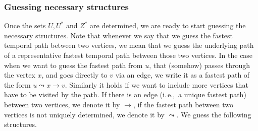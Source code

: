 \documentclass[a4paper,UKenglish,cleveref, autoref, thm-restate, anonymous]{lipics-v2021}
\newcommand{\ie}{i.\,e.,\ }
\begin{document}
\subsubsection{Guessing necessary structures \label{sec:FPT-guessing}}
Once the sets $U, U^*$ and $Z^*$ are determined, we are ready to start guessing  the necessary structures.
Note that whenever we say that we guess the fastest temporal path between two vertices, we mean that we guess the underlying path of a representative fastest temporal path between those two vertices.
In the case when we want to guess the fastest path from $u$, that (somehow) passes through the vertex $x$, and goes directly to $v$ via an edge, we write it as a fastest path of the form $u \leadsto x \rightarrow v$.
Similarly it holds if we want to include more vertices that have to be visited by the path. If there is an edge (\ie a unique fastest path) between two vertices, we denote it by $\rightarrow$,
if the fastest path between two vertices is not uniquely determined, we denote it by $\leadsto$.
We guess the following structures.
\end{document}
